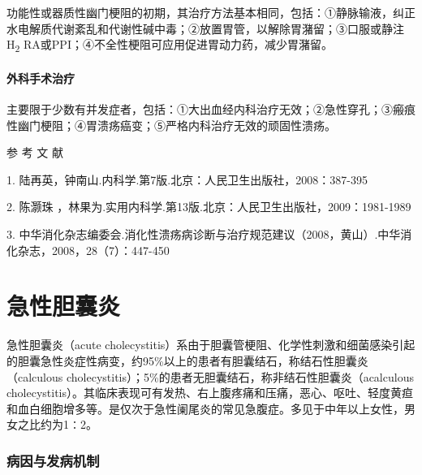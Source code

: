 功能性或器质性幽门梗阻的初期，其治疗方法基本相同，包括：①静脉输液，纠正水电解质代谢紊乱和代谢性碱中毒；②放置胃管，以解除胃潴留；③口服或静注H\textsubscript{2}
RA或PPI；④不全性梗阻可应用促进胃动力药，减少胃潴留。

\subsubsection{外科手术治疗}

主要限于少数有并发症者，包括：①大出血经内科治疗无效；②急性穿孔；③瘢痕性幽门梗阻；④胃溃疡癌变；⑤严格内科治疗无效的顽固性溃疡。\protect\hypertarget{text00319.html}{}{}

\hypertarget{text00319.htmlux5cux23CHP11-2-4}{}
参 考 文 献

1. 陆再英，钟南山.内科学.第7版.北京：人民卫生出版社，2008：387-395

2. 陈灏珠
，林果为.实用内科学.第13版.北京：人民卫生出版社，2009：1981-1989

3.
中华消化杂志编委会.消化性溃疡病诊断与治疗规范建议（2008，黄山）.中华消化杂志，2008，28（7）：447-450

\protect\hypertarget{text00320.html}{}{}

\chapter{急性胆囊炎}

急性胆囊炎（acute
cholecystitis）系由于胆囊管梗阻、化学性刺激和细菌感染引起的胆囊急性炎症性病变，约95\%以上的患者有胆囊结石，称结石性胆囊炎（calculous
cholecystitis）；5\%的患者无胆囊结石，称非结石性胆囊炎（acalculous
cholecystitis）。其临床表现可有发热、右上腹疼痛和压痛，恶心、呕吐、轻度黄疸和血白细胞增多等。是仅次于急性阑尾炎的常见急腹症。多见于中年以上女性，男女之比约为1∶2。

\subsection{病因与发病机制}

